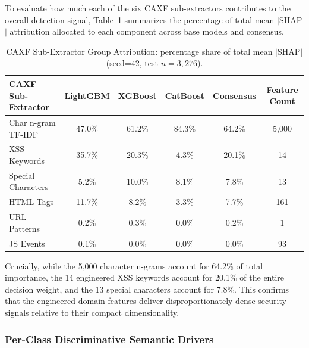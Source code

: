 \documentclass[11pt,a4paper]{article}
\begin{document}
To evaluate how much each of the six CAXF sub-extractors contributes to the overall detection signal,
Table~\ref{tab:shap_group_attribution} summarizes the percentage of total mean $|$SHAP$|$ attribution
allocated to each component across base models and consensus.

\begin{table}[ht]
\centering
\caption{CAXF Sub-Extractor Group Attribution: percentage share of total mean $|$SHAP$|$ (seed=42, test $n{=}3{,}276$).}
\label{tab:shap_group_attribution}
\begin{tabular}{lccccc}
\toprule
\textbf{CAXF Sub-Extractor} & \textbf{LightGBM} & \textbf{XGBoost} & \textbf{CatBoost} & \textbf{Consensus} & \textbf{Feature Count} \\
\midrule
Char n-gram TF-IDF & 47.0\% & 61.2\% & 84.3\% & 64.2\% & 5,000 \\
XSS Keywords        & 35.7\% & 20.3\% &  4.3\% & 20.1\% & 14 \\
Special Characters  &  5.2\% & 10.0\% &  8.1\% &  7.8\% & 13 \\
HTML Tags           & 11.7\% &  8.2\% &  3.3\% &  7.7\% & 161 \\
URL Patterns        &  0.2\% &  0.3\% &  0.0\% &  0.2\% & 1 \\
JS Events           &  0.1\% &  0.0\% &  0.0\% &  0.0\% & 93 \\
\bottomrule
\end{tabular}
\end{table}

Crucially, while the 5,000 character n-grams account for 64.2\% of total importance, the 14 engineered
XSS keywords account for 20.1\% of the entire decision weight, and the 13 special characters account for 7.8\%.
This confirms that the engineered domain features deliver disproportionately dense security signals relative to their compact dimensionality.

\subsubsection{Per-Class Discriminative Semantic Drivers}
\end{document}
